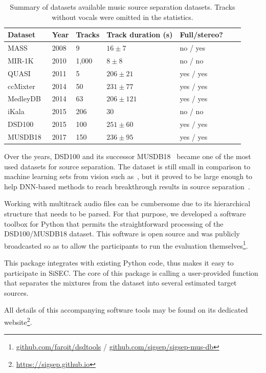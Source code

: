 \begin{table}[htbp]
	\centering
  \begin{tabular}{l l l l l l l}
    \toprule
    \textbf{Dataset} & \textbf{Year} & \textbf{Tracks} & \textbf{Track duration (s)} & \textbf{Full/stereo?}\\
    \midrule
    MASS~\cite{MTGMASSdb} & 2008 & 9 & $16 \pm 7$ & no / yes \\
    MIR-1K~\cite{hsu10} & 2010 & 1,000 & $8 \pm 8$ & no / no \\
    QUASI~\cite{liutkus11,vincent12} & 2011 & 5 & $206 \pm 21$ & yes / yes \\
    ccMixter~\cite{liutkus142} & 2014 & 50 & $231 \pm 77 $ & yes / yes \\
    MedleyDB~\cite{bittner14} & 2014 & 63 & $206 \pm 121$ & yes / yes \\
    iKala~\cite{chan15} & 2015 & 206 & 30 & no / no \\
    DSD100~\cite{liutkus17} & 2015 & 100 & $251 \pm 60$ & yes / yes \\
    MUSDB18~\cite{stoeter18sisec} & 2017 & 150 & $236 \pm 95$ & yes / yes \\
    \bottomrule
  \end{tabular}
  \caption{Summary of datasets available music source separation datasets. Tracks without vocals were omitted in the statistics.}
	\label{tab:datasets}
\end{table}

Over the years, DSD100 and its successor MUSDB18~\cite{oss_musdb} became one of the most used datasets for source separation.
The dataset is still small in comparison to machine learning sets from vision such as~\cite{imagenet09}, but it proved to be large enough to help DNN-based methods to reach breakthrough results in source separation~\cite{stoeter18sisec}.
\par
Working with multitrack audio files can be cumbersome due to its hierarchical structure that needs to be parsed.
For that purpose, we developed a software toolbox for Python that permits the straightforward processing of the DSD100/MUSDB18 dataset. This software is open source and was publicly broadcasted so as to allow the participants to run the evaluation themselves\footnote{\url{github.com/faroit/dsdtools} / \url{github.com/sigsep/sigsep-mus-db}}.
\par
This package integrates with existing Python code, thus makes it easy to participate in SiSEC. The core of this package is calling a user-provided function that separates the mixtures from the dataset into several estimated target sources.

All details of this accompanying software tools may be found on its dedicated website\footnote{\url{https://sigsep.github.io}}.